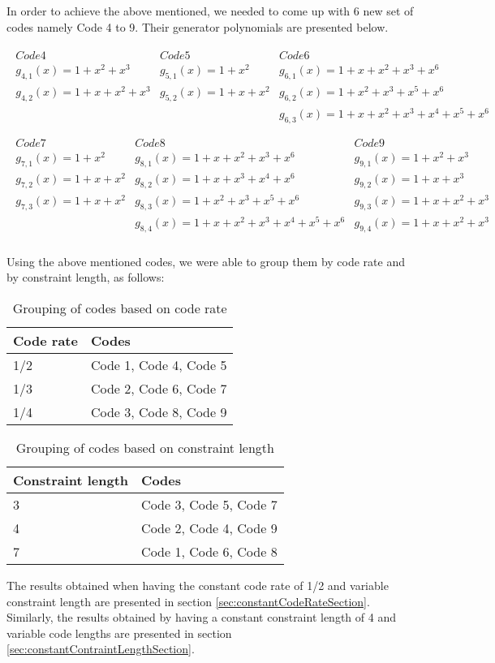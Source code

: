 In order to achieve the above mentioned, we needed to come up with 6 new set of codes namely Code 4 to 9. Their generator polynomials are presented below.

\begin{align*}
\begin{matrix}
Code 4&Code 5&Code 6\\
g_{4,1}(x) = 1 + x^2 + x^3&g_{5,1}(x) = 1 + x^2&g_{6,1}(x)=1 + x + x^2 + x^3 + x^6\\
g_{4,2}(x) = 1+x+x^2+x^3&g_{5,2}(x) = 1+x+x^2&g_{6,2}(x)=1 + x^2 + x^3 + x^5 + x^6\\
&&g_{6,3}(x)=1 + x + x^2 + x^3 + x^4 + x^5 + x^6\\
\end{matrix}\\
\begin{matrix}
Code 7&Code 8&Code 9\\
g_{7,1}(x) = 1 + x^2&g_{8,1}(x) = 1 + x + x^2 + x^3 + x^6&g_{9,1}(x)=1 + x^2 + x^3\\
g_{7,2}(x) = 1+x+x^2&g_{8,2}(x) = 1 + x + x^3 + x^4 + x^6&g_{9,2}(x)=1 + x + x^3\\
g_{7,3}(x) = 1+x+x^2&g_{8,3}(x) = 1 + x^2 + x^3 + x^5 + x^6&g_{9,3}(x)=1+x+x^2+x^3\\
&g_{8,4}(x) = 1 + x + x^2 + x^3 + x^4 + x^5 + x^6&g_{9,4}(x)=1+x+x^2+x^3\\
\end{matrix}
\end{align*}

Using the above mentioned codes, we were able to group them by code rate and by constraint length, as follows:

\begin{table}[h]
\centering
\caption{Grouping of codes based on code rate}
\begin{tabular}{ll}
\hline
Code rate &  Codes \\ \hline
1/2 & Code 1, Code 4, Code 5 \\
1/3 & Code 2, Code 6, Code 7 \\
1/4 & Code 3, Code 8, Code 9 \\
\end{tabular}
\end{table}

\begin{table}[h]
\centering
\caption{Grouping of codes based on constraint length}
\begin{tabular}{ll}
\hline
Constraint length &  Codes \\ \hline
3 & Code 3, Code 5, Code 7 \\
4 & Code 2, Code 4, Code 9 \\
7 & Code 1, Code 6, Code 8 \\
\end{tabular}
\end{table}

The results obtained when having the constant code rate of 1/2 and variable constraint length are presented in section \ref{sec:constantCodeRateSection}. Similarly, the results obtained by having a constant constraint length of 4 and variable code lengths are presented in section \ref{sec:constantContraintLengthSection}.

 